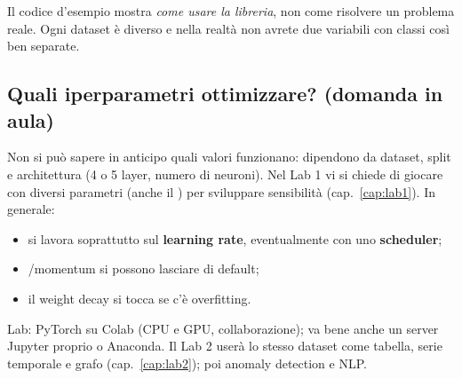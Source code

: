 \begin{attenzione}
Il codice d'esempio mostra \emph{come usare la libreria}, non come risolvere un problema reale. Ogni dataset è diverso e nella
realtà non avrete due variabili con classi così ben separate.
\end{attenzione}

\subsection{Quali iperparametri ottimizzare? (domanda in aula)}
Non si può sapere in anticipo quali valori funzionano: dipendono da dataset, split e architettura (4 o 5 layer, numero di neuroni).
Nel Lab 1 vi si chiede di giocare con diversi parametri (anche il ) per sviluppare sensibilità
(cap.~\ref{cap:lab1}). In generale:
\begin{itemize}
  \item si lavora soprattutto sul \textbf{learning rate}, eventualmente con uno \textbf{scheduler};
  \item {}/momentum si possono lasciare di default;
  \item il weight decay si tocca se c'è overfitting.
\end{itemize}
Lab: PyTorch su Colab (CPU e GPU, collaborazione); va bene anche un server Jupyter proprio o Anaconda. Il Lab 2 userà lo stesso
dataset come tabella, serie temporale e grafo (cap.~\ref{cap:lab2}); poi anomaly detection e NLP.

